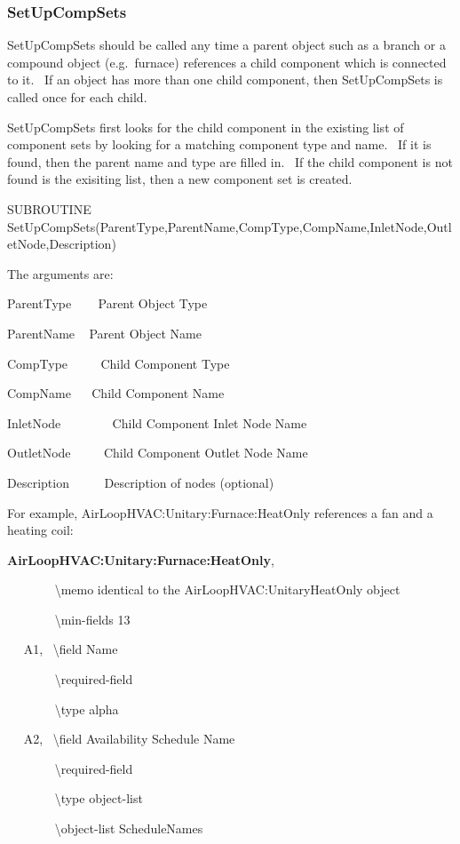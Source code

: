 \subsubsection{SetUpCompSets}\label{setupcompsets}

SetUpCompSets should be called any time a parent object such as a branch or a compound object (e.g.~furnace) references a child component which is connected to it.~ If an object has more than one child component, then SetUpCompSets is called once for each child.

SetUpCompSets first looks for the child component in the existing list of component sets by looking for a matching component type and name.~ If it is found, then the parent name and type are filled in.~ If the child component is not found is the exisiting list, then a new component set is created.

SUBROUTINE SetUpCompSets(ParentType,ParentName,CompType,CompName,InletNode,OutletNode,Description)

The arguments are:

ParentType ~~~ Parent Object Type

ParentName ~ Parent Object Name

CompType ~~~~ Child Component Type

CompName ~~ Child Component Name

InletNode ~~~~~~~ Child Component Inlet Node Name

OutletNode ~~~~ Child Component Outlet Node Name

Description~~~~~ Description of nodes (optional)

For example, AirLoopHVAC:Unitary:Furnace:HeatOnly references a fan and a heating coil:

\textbf{AirLoopHVAC:Unitary:Furnace:HeatOnly},

~~~~~~~ \textbackslash{}memo identical to the AirLoopHVAC:UnitaryHeatOnly object

~~~~~~~ \textbackslash{}min-fields 13

~~ A1,~ \textbackslash{}field Name

~~~~~~~ \textbackslash{}required-field

~~~~~~~ \textbackslash{}type alpha

~~ A2,~ \textbackslash{}field Availability Schedule Name

~~~~~~~ \textbackslash{}required-field

~~~~~~~ \textbackslash{}type object-list

~~~~~~~ \textbackslash{}object-list ScheduleNames

